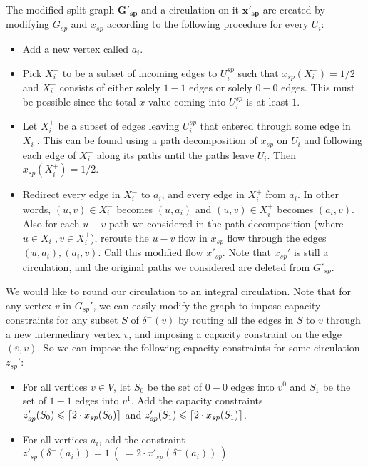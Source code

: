 \documentclass[./main.tex]{subfiles}
\DeclarePairedDelimiter\ceil{\lceil}{\rceil}
\begin{document}
		\begin{definition}\label{def:6.1}
			The modified split graph $\bm{G'_{sp}}$ and a circulation on it $\bm{x'_{sp}}$ are created by modifying $G_{sp}$ and $x_{sp}$ according to the following procedure for every $U_i$:
			\begin{itemize}[-]
				\item Add a new vertex called $a_i$.

				\item Pick $X_i^-$ to be a subset of incoming edges to $U_i^{sp}$ such that $x_{sp}(X_i^-) = 1/2$ and $X_i^-$ consists of either solely $1-1$ edges or solely $0-0$ edges. This must be possible since the total $x$-value coming into $U_i^{sp}$ is at least $1$.

				\item Let $X_i^+$ be a subset of edges leaving $U_i^{sp}$ that entered through some edge in $X_i^-$. This can be found using a path decomposition of $x_{sp}$ on $U_i$ and following each edge of $X_i^-$ along its paths until the paths leave $U_i$. Then $x_{sp}(X_i^+) = 1/2$.

				\item Redirect every edge in $X_i^-$ to $a_i$, and every edge in $X_i^+$ from $a_i$. In other words, $(u,v)\in X_i^-$ becomes $(u,a_i)$ and $(u,v)\in X_i^+$ becomes $(a_i, v)$. Also for each $u-v$ path we considered in the path decomposition (where $u\in X_i^-, v\in X_i^+$), reroute the $u-v$ flow in $x_{sp}$ flow through the edges $(u,a_i),(a_i,v)$. Call this modified flow $x'_{sp}$. Note that $x_{sp}'$ is still a circulation, and the original paths we considered are deleted from $G'_{sp}$.\\
			\end{itemize}
		\end{definition}
		We would like to round our circulation to an integral circulation.
		Note that for any vertex $v$ in $G_{sp}'$, we can easily modify the graph to impose capacity constraints for any subset $S$ of $\delta^-(v)$ by routing all the edges in $S$ to $v$ through a new intermediary vertex $\overline{v}$, and imposing a capacity constraint on the edge $(\overline{v},v)$.
		So we can impose the following capacity constraints for some circulation $z_{sp}'$:
		\begin{itemize}[-]
			\item For all vertices $v\in V$, let $S_0$ be the set of $0-0$ edges into $v^0$ and $S_1$ be the set of $1-1$ edges into $v^1$.
					Add the capacity constraints $z'_{sp}(S_0)\leqslant \ceil{2\cdot x_{sp}(S_0)}$ and $z'_{sp}(S_1)\leqslant \ceil{2\cdot x_{sp}(S_1)}$.

			\item For all vertices $a_i$, add the constraint $z'_{sp}(\delta^-(a_i)) = 1\  (\ = 2\cdot x'_{sp}(\delta^-(a_i))\ )$
		\end{itemize}
\end{document}
